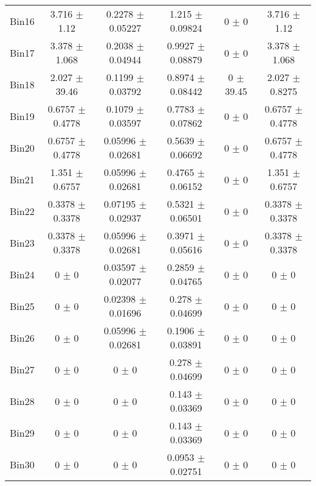 \begin{tabular}{@{\extracolsep{4pt}}lccccc@{}}
     Bin16 & 3.716 $\pm$ 1.12 & 0.2278 $\pm$ 0.05227 & 1.215 $\pm$ 0.09824 & 0 $\pm$ 0 & 3.716 $\pm$ 1.12 \\ 
     Bin17 & 3.378 $\pm$ 1.068 & 0.2038 $\pm$ 0.04944 & 0.9927 $\pm$ 0.08879 & 0 $\pm$ 0 & 3.378 $\pm$ 1.068 \\ 
     Bin18 & 2.027 $\pm$ 39.46 & 0.1199 $\pm$ 0.03792 & 0.8974 $\pm$ 0.08442 & 0 $\pm$ 39.45 & 2.027 $\pm$ 0.8275 \\ 
     Bin19 & 0.6757 $\pm$ 0.4778 & 0.1079 $\pm$ 0.03597 & 0.7783 $\pm$ 0.07862 & 0 $\pm$ 0 & 0.6757 $\pm$ 0.4778 \\ 
     Bin20 & 0.6757 $\pm$ 0.4778 & 0.05996 $\pm$ 0.02681 & 0.5639 $\pm$ 0.06692 & 0 $\pm$ 0 & 0.6757 $\pm$ 0.4778 \\ 
     Bin21 & 1.351 $\pm$ 0.6757 & 0.05996 $\pm$ 0.02681 & 0.4765 $\pm$ 0.06152 & 0 $\pm$ 0 & 1.351 $\pm$ 0.6757 \\ 
     Bin22 & 0.3378 $\pm$ 0.3378 & 0.07195 $\pm$ 0.02937 & 0.5321 $\pm$ 0.06501 & 0 $\pm$ 0 & 0.3378 $\pm$ 0.3378 \\ 
     Bin23 & 0.3378 $\pm$ 0.3378 & 0.05996 $\pm$ 0.02681 & 0.3971 $\pm$ 0.05616 & 0 $\pm$ 0 & 0.3378 $\pm$ 0.3378 \\ 
     Bin24 & 0 $\pm$ 0 & 0.03597 $\pm$ 0.02077 & 0.2859 $\pm$ 0.04765 & 0 $\pm$ 0 & 0 $\pm$ 0 \\ 
     Bin25 & 0 $\pm$ 0 & 0.02398 $\pm$ 0.01696 & 0.278 $\pm$ 0.04699 & 0 $\pm$ 0 & 0 $\pm$ 0 \\ 
     Bin26 & 0 $\pm$ 0 & 0.05996 $\pm$ 0.02681 & 0.1906 $\pm$ 0.03891 & 0 $\pm$ 0 & 0 $\pm$ 0 \\ 
     Bin27 & 0 $\pm$ 0 & 0 $\pm$ 0 & 0.278 $\pm$ 0.04699 & 0 $\pm$ 0 & 0 $\pm$ 0 \\ 
     Bin28 & 0 $\pm$ 0 & 0 $\pm$ 0 & 0.143 $\pm$ 0.03369 & 0 $\pm$ 0 & 0 $\pm$ 0 \\ 
     Bin29 & 0 $\pm$ 0 & 0 $\pm$ 0 & 0.143 $\pm$ 0.03369 & 0 $\pm$ 0 & 0 $\pm$ 0 \\ 
     Bin30 & 0 $\pm$ 0 & 0 $\pm$ 0 & 0.0953 $\pm$ 0.02751 & 0 $\pm$ 0 & 0 $\pm$ 0 \\ 
\hline\hline
  \end{tabular}
